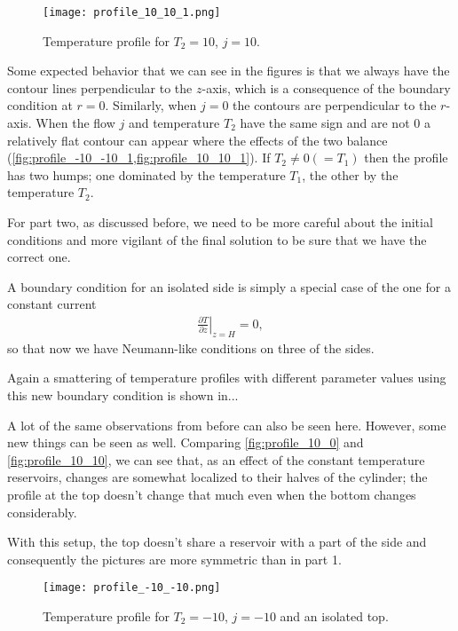 \documentclass[10pt,a4paper,twocolumn]{article}
\begin{document}
\begin{figure}[!hb]
    \centering
    \texttt{[image: profile\_10\_10\_1.png]}
    \caption{Temperature profile for $T_2=10$, $j=10$.}
    \label{fig:profile_10_10_1}
\end{figure}

\clearpage

Some expected behavior that we can see in the figures is that we always have the contour lines perpendicular to the $z$-axis, which is a consequence of the boundary condition at $r=0$. Similarly, when $j=0$ the contours are perpendicular to the $r$-axis. When the flow $j$ and temperature $T_2$ have the same sign and are not $0$ a relatively flat contour can appear where the effects of the two balance (\cref{fig:profile_-10_-10_1,fig:profile_10_10_1}). If $T_2 \neq 0 (=T_1)$ then the profile has two humps; one dominated by the temperature $T_1$, the other by the temperature $T_2$.


For part two, as discussed before, we need to be more careful about the initial conditions and more vigilant of the final solution to be sure that we have the correct one.

A boundary condition for an isolated side is simply a special case of the one for a constant current
%
\begin{align}
    \left. \frac{\partial T}{\partial z} \right|_{z=H} = 0,
\end{align}
%
so that now we have Neumann-like conditions on three of the sides.

Again a smattering of temperature profiles with different parameter values using this new boundary condition is shown in...

A lot of the same observations from before can also be seen here. However, some new things can be seen as well. Comparing \cref{fig:profile_10_0} and \cref{fig:profile_10_10}, we can see that, as an effect of the constant temperature reservoirs, changes are somewhat localized to their halves of the cylinder; the profile at the top doesn't change that much even when the bottom changes considerably.

With this setup, the top doesn't share a reservoir with a part of the side and consequently the pictures are more symmetric than in part 1.

\begin{figure}[!ht]
    \centering
    \texttt{[image: profile\_-10\_-10.png]}
    \caption{Temperature profile for $T_2=-10$, $j=-10$ and an isolated top.}
    \label{fig:profile_-10_-10}
\end{figure}
\end{document}
